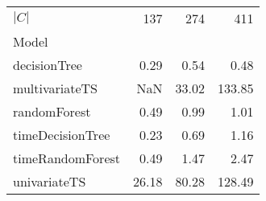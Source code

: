 \begin{tabular}{lrrr}
\toprule
$|C|$ & 137 & 274 & 411 \\
Model &  &  &  \\
\midrule
decisionTree & 0.29 & 0.54 & 0.48 \\
multivariateTS & NaN & 33.02 & 133.85 \\
randomForest & 0.49 & 0.99 & 1.01 \\
timeDecisionTree & 0.23 & 0.69 & 1.16 \\
timeRandomForest & 0.49 & 1.47 & 2.47 \\
univariateTS & 26.18 & 80.28 & 128.49 \\
\bottomrule
\end{tabular}
